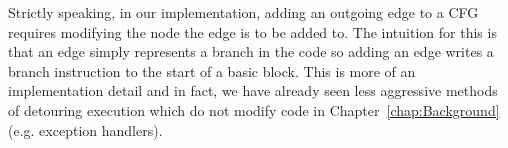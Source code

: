 Strictly speaking, in our implementation, adding an outgoing edge to a CFG requires modifying the node the edge is to be added to. The intuition for this is that an edge simply represents a branch in the code so adding an edge writes a branch instruction to the start of a basic block. This is more of an implementation detail and in fact, we have already seen less aggressive methods of detouring execution which do not modify code in Chapter~\ref{chap:Background} (e.g. exception handlers).